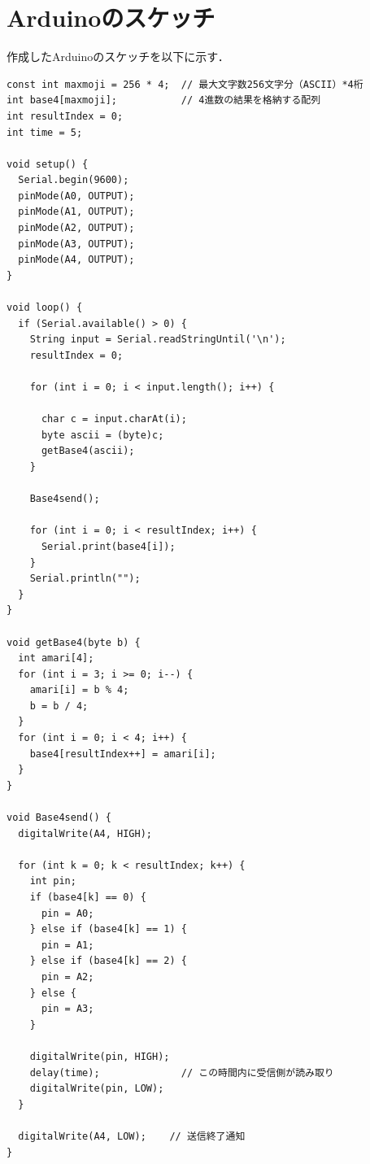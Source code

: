 \section{Arduinoのスケッチ}
作成したArduinoのスケッチを以下に示す．

\vspace{1cm}\begin{lstlisting}[caption=sound\_tx.ino]
const int maxmoji = 256 * 4;  // 最大文字数256文字分（ASCII）*4桁
int base4[maxmoji];           // 4進数の結果を格納する配列
int resultIndex = 0;
int time = 5;

void setup() {
  Serial.begin(9600);
  pinMode(A0, OUTPUT);
  pinMode(A1, OUTPUT);
  pinMode(A2, OUTPUT);
  pinMode(A3, OUTPUT);
  pinMode(A4, OUTPUT);
}

void loop() {
  if (Serial.available() > 0) {
    String input = Serial.readStringUntil('\n');
    resultIndex = 0;

    for (int i = 0; i < input.length(); i++) {

      char c = input.charAt(i);
      byte ascii = (byte)c;
      getBase4(ascii);
    }

    Base4send();
    
    for (int i = 0; i < resultIndex; i++) {
      Serial.print(base4[i]);
    }
    Serial.println("");
  }
}

void getBase4(byte b) {
  int amari[4];
  for (int i = 3; i >= 0; i--) {
    amari[i] = b % 4;
    b = b / 4;
  }
  for (int i = 0; i < 4; i++) {
    base4[resultIndex++] = amari[i];
  }
}

void Base4send() {
  digitalWrite(A4, HIGH);

  for (int k = 0; k < resultIndex; k++) {
    int pin;
    if (base4[k] == 0) {
      pin = A0;
    } else if (base4[k] == 1) {
      pin = A1;
    } else if (base4[k] == 2) {
      pin = A2;
    } else {
      pin = A3;
    }

    digitalWrite(pin, HIGH);
    delay(time);              // この時間内に受信側が読み取り
    digitalWrite(pin, LOW);
  }

  digitalWrite(A4, LOW);    // 送信終了通知
}

\end{lstlisting}

